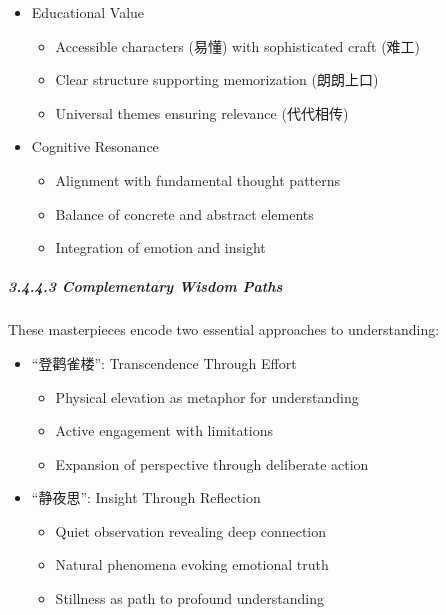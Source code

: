 \begin{itemize}
\tightlist
\item
  Educational Value

  \begin{itemize}
  \tightlist
  \item
    Accessible characters (易懂) with sophisticated craft (难工)
  \item
    Clear structure supporting memorization (朗朗上口)
  \item
    Universal themes ensuring relevance (代代相传)
  \end{itemize}
\item
  Cognitive Resonance

  \begin{itemize}
  \tightlist
  \item
    Alignment with fundamental thought patterns
  \item
    Balance of concrete and abstract elements
  \item
    Integration of emotion and insight
  \end{itemize}
\end{itemize}

\subparagraph{3.4.4.3 Complementary Wisdom
Paths}\label{complementary-wisdom-paths}

These masterpieces encode two essential approaches to understanding:

\begin{itemize}
\tightlist
\item
  ``登鹳雀楼'': Transcendence Through Effort

  \begin{itemize}
  \tightlist
  \item
    Physical elevation as metaphor for understanding
  \item
    Active engagement with limitations
  \item
    Expansion of perspective through deliberate action
  \end{itemize}
\item
  ``静夜思'': Insight Through Reflection

  \begin{itemize}
  \tightlist
  \item
    Quiet observation revealing deep connection
  \item
    Natural phenomena evoking emotional truth
  \item
    Stillness as path to profound understanding
  \end{itemize}
\end{itemize}

